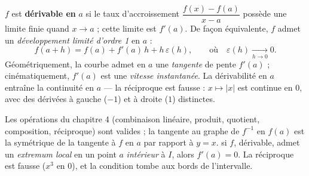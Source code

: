 
\begin{definition}
$f$ est \textbf{dérivable en} $a$ si le taux d'accroissement
$\dfrac{f(x)-f(a)}{x-a}$ possède une limite finie quand $x\to a$ ; cette
limite est $f'(a)$. De façon équivalente, $f$ admet un
\emph{développement limité d'ordre 1} en $a$ :
\[
  f(a+h)=f(a)+f'(a)\,h+h\,\varepsilon(h),
  \qquad\text{où}\quad\varepsilon(h)\xrightarrow[h\to0]{}0.
\]
Géométriquement, la courbe admet en $a$ une \emph{tangente} de pente
$f'(a)$ ; cinématiquement, $f'(a)$ est une \emph{vitesse instantanée}.
La dérivabilité en $a$ entraîne la continuité en $a$ — la réciproque est
fausse : $x\mapsto|x|$ est continue en $0$, avec des dérivées à gauche
($-1$) et à droite ($1$) distinctes.
\end{definition}

\begin{propriete}
Les opérations du chapitre 4 (combinaison linéaire, produit, quotient,
composition, réciproque) sont valides ; la tangente au graphe de $f^{-1}$
en $f(a)$ est la symétrique de la tangente à $f$ en $a$ par rapport à
$y=x$.  si $f$, dérivable, admet un \emph{extremum
local} en un point $a$ \emph{intérieur} à $I$, alors $f'(a)=0$. La
réciproque est fausse ($x^{3}$ en $0$), et la condition tombe aux bords de
l'intervalle.
\end{propriete}


